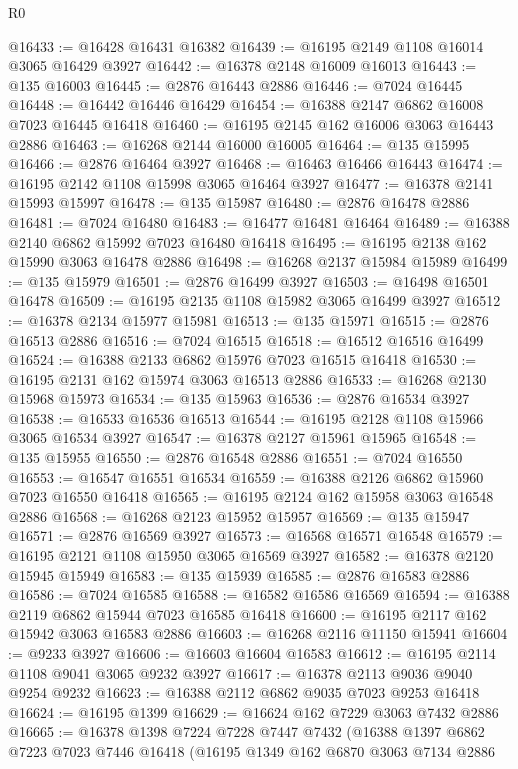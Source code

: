 \begin{lexlean}{R0}
\begin{coremodule}
@16433 := @16428 @16431 @16382
@16439 := @16195 @2149 @1108 @16014 @3065 @16429 @3927
@16442 := @16378 @2148 @16009 @16013
@16443 := @135 @16003
@16445 := @2876 @16443 @2886
@16446 := @7024 @16445
@16448 := @16442 @16446 @16429
@16454 := @16388 @2147 @6862 @16008 @7023 @16445 @16418
@16460 := @16195 @2145 @162 @16006 @3063 @16443 @2886
@16463 := @16268 @2144 @16000 @16005
@16464 := @135 @15995
@16466 := @2876 @16464 @3927
@16468 := @16463 @16466 @16443
@16474 := @16195 @2142 @1108 @15998 @3065 @16464 @3927
@16477 := @16378 @2141 @15993 @15997
@16478 := @135 @15987
@16480 := @2876 @16478 @2886
@16481 := @7024 @16480
@16483 := @16477 @16481 @16464
@16489 := @16388 @2140 @6862 @15992 @7023 @16480 @16418
@16495 := @16195 @2138 @162 @15990 @3063 @16478 @2886
@16498 := @16268 @2137 @15984 @15989
@16499 := @135 @15979
@16501 := @2876 @16499 @3927
@16503 := @16498 @16501 @16478
@16509 := @16195 @2135 @1108 @15982 @3065 @16499 @3927
@16512 := @16378 @2134 @15977 @15981
@16513 := @135 @15971
@16515 := @2876 @16513 @2886
@16516 := @7024 @16515
@16518 := @16512 @16516 @16499
@16524 := @16388 @2133 @6862 @15976 @7023 @16515 @16418
@16530 := @16195 @2131 @162 @15974 @3063 @16513 @2886
@16533 := @16268 @2130 @15968 @15973
@16534 := @135 @15963
@16536 := @2876 @16534 @3927
@16538 := @16533 @16536 @16513
@16544 := @16195 @2128 @1108 @15966 @3065 @16534 @3927
@16547 := @16378 @2127 @15961 @15965
@16548 := @135 @15955
@16550 := @2876 @16548 @2886
@16551 := @7024 @16550
@16553 := @16547 @16551 @16534
@16559 := @16388 @2126 @6862 @15960 @7023 @16550 @16418
@16565 := @16195 @2124 @162 @15958 @3063 @16548 @2886
@16568 := @16268 @2123 @15952 @15957
@16569 := @135 @15947
@16571 := @2876 @16569 @3927
@16573 := @16568 @16571 @16548
@16579 := @16195 @2121 @1108 @15950 @3065 @16569 @3927
@16582 := @16378 @2120 @15945 @15949
@16583 := @135 @15939
@16585 := @2876 @16583 @2886
@16586 := @7024 @16585
@16588 := @16582 @16586 @16569
@16594 := @16388 @2119 @6862 @15944 @7023 @16585 @16418
@16600 := @16195 @2117 @162 @15942 @3063 @16583 @2886
@16603 := @16268 @2116 @11150 @15941
@16604 := @9233 @3927
@16606 := @16603 @16604 @16583
@16612 := @16195 @2114 @1108 @9041 @3065 @9232 @3927
@16617 := @16378 @2113 @9036 @9040 @9254 @9232
@16623 := @16388 @2112 @6862 @9035 @7023 @9253 @16418
@16624 := @16195 @1399
@16629 := @16624 @162 @7229 @3063 @7432 @2886
@16665 := @16378
    @1398
    @7224
    @7228
    @7447
    @7432
    (@16388
      @1397
      @6862
      @7223
      @7023
      @7446
      @16418
      (@16195
        @1349
        @162
        @6870
        @3063
        @7134
        @2886

\end{coremodule}
\end{lexlean}
